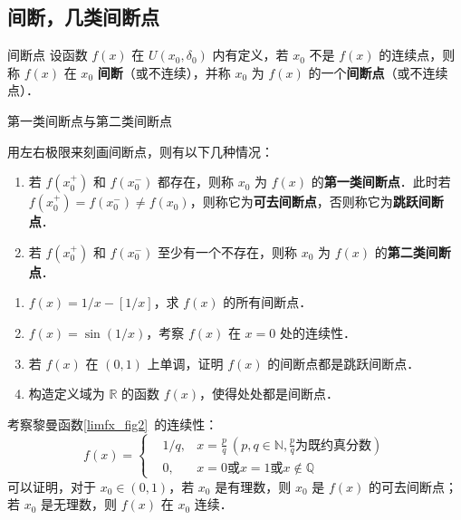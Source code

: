 \subsection{间断，几类间断点}
\begin{definition}{间断点}
  设函数 $f(x)$ 在 $U(x_0,\delta_0)$ 内有定义，若 $x_0$ 不是 $f(x)$ 的连续点，则称 $f(x)$ 在 $x_0$ \textbf{间断}（或不连续），并称 $x_0$ 为 $f(x)$ 的一个\textbf{间断点}（或不连续点）．
\end{definition}
\begin{definition}{第一类间断点与第二类间断点}

用左右极限来刻画间断点，则有以下几种情况：
\begin{enumerate}
\item 若 $f(x_0^+)$ 和 $f(x_0^-)$ 都存在，则称 $x_0$ 为 $f(x)$ 的\textbf{第一类间断点}．此时若 $f(x_0^+)=f(x_0^-)\neq f(x_0)$，则称它为\textbf{可去间断点}，否则称它为\textbf{跳跃间断点}．
\item 若 $f(x_0^+)$ 和 $f(x_0^-)$ 至少有一个不存在，则称 $x_0$ 为 $f(x)$ 的\textbf{第二类间断点}．
\end{enumerate}
\end{definition}

\begin{exercise}{}
\begin{enumerate}
\item $f(x)=1/x-[1/x]$，求 $f(x)$ 的所有间断点．
\item $f(x)=\sin(1/x)$，考察 $f(x)$ 在 $x=0$ 处的连续性．
\item 若 $f(x)$ 在 $(0,1)$ 上单调，证明 $f(x)$ 的间断点都是跳跃间断点．
\item 构造定义域为 $\mathbb{R}$ 的函数 $f(x)$，使得处处都是间断点． 
\end{enumerate}
\end{exercise}
  
考察黎曼函数\autoref{limfx_fig2}~的连续性：
\begin{equation}
f(x)=\left\{
\begin{aligned}
&1/q, &x=\frac{p}{q}\ (p,q\in \mathbb{N}, \frac{p}{q}\text{为既约真分数})\\
&0,&x=0\text{或}x=1\text{或} x\notin \mathbb{Q}
\end{aligned} \right.
\end{equation}
可以证明，对于 $x_0\in(0,1)$，若 $x_0$ 是有理数，则 $x_0$ 是 $f(x)$ 的可去间断点；若 $x_0$ 是无理数，则 $f(x)$ 在 $x_0$ 连续．

